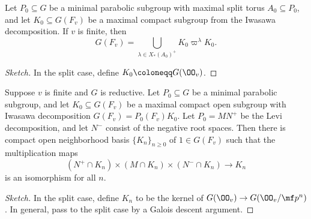 \documentclass{article}
\begin{document}
\begin{theorem}[Cartan]
	Let $P_0\subseteq G$ be a minimal parabolic subgroup with maximal split torus $A_0\subseteq P_0$, and let $K_0\subseteq G(F_v)$ be a maximal compact subgroup from the Iwasawa decomposition. If $v$ is finite, then
	\[G(F_v)=\bigcup_{\lambda\in X_*(A_0)^+}K_0\varpi^\lambda K_0.\]
\end{theorem}
\begin{proof}[Sketch]
	In the split case, define $K_0\coloneqq G(\OO_v)$.
\end{proof}
\begin{theorem}[Iwahori]
	Suppose $v$ is finite and $G$ is reductive. Let $P_0\subseteq G$ be a minimal parabolic subgroup, and let $K_0\subseteq G(F_v)$ be a maximal compact open subgroup with Iwasawa decomposition $G(F_v)=P_0(F_v)K_0$. Let $P_0=MN^+$ be the Levi decomposition, and let $N^-$ consist of the negative root spaces. Then there is compact open neighborhood basis $\{K_n\}_{n\ge0}$ of $1\in G(F_v)$ such that the multiplication maps
	\[\left(N^+\cap K_n\right)\times(M\cap K_n)\times(N^-\cap K_n)\to K_n\]
	is an isomorphism for all $n$.
\end{theorem}
\begin{proof}[Sketch]
	In the split case, define $K_n$ to be the kernel of $G(\OO_v)\to G(\OO_v/\mf p^n)$. In general, pass to the split case by a Galois descent argument.
\end{proof}
\end{document}
